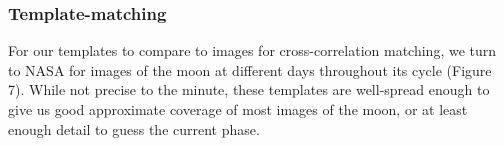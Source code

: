 \documentclass[]{article}
\begin{document}
\subsubsection*{Template-matching}
For our templates to compare to images for cross-correlation matching, we turn to NASA for images of the moon at different days throughout its cycle (Figure 7). While not precise to the minute, these templates are well-spread enough to give us good approximate coverage of most images of the moon, or at least enough detail to guess the current phase.
\begin{figure}[h]
\centering
{}

\end{figure}
\end{document}
